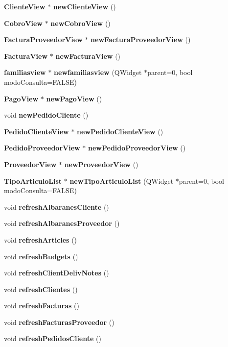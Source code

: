 \begin{CompactItemize}
\item 
{\bf Cliente\-View} $\ast$ {\bf new\-Cliente\-View} ()
\item 
{\bf Cobro\-View} $\ast$ {\bf new\-Cobro\-View} ()\label{classcompany_a17}

\item 
{\bf Factura\-Proveedor\-View} $\ast$ {\bf new\-Factura\-Proveedor\-View} ()
\item 
{\bf Factura\-View} $\ast$ {\bf new\-Factura\-View} ()
\item 
{\bf familiasview} $\ast$ {\bf newfamiliasview} (QWidget $\ast$parent=0, bool modo\-Consulta=FALSE)
\item 
{\bf Pago\-View} $\ast$ {\bf new\-Pago\-View} ()
\item 
void {\bf new\-Pedido\-Cliente} ()\label{classcompany_a22}

\item 
{\bf Pedido\-Cliente\-View} $\ast$ {\bf new\-Pedido\-Cliente\-View} ()
\item 
{\bf Pedido\-Proveedor\-View} $\ast$ {\bf new\-Pedido\-Proveedor\-View} ()
\item 
{\bf Proveedor\-View} $\ast$ {\bf new\-Proveedor\-View} ()
\item 
{\bf Tipo\-Articulo\-List} $\ast$ {\bf new\-Tipo\-Articulo\-List} (QWidget $\ast$parent=0, bool modo\-Consulta=FALSE)
\item 
void {\bf refresh\-Albaranes\-Cliente} ()\label{classcompany_a27}

\item 
void {\bf refresh\-Albaranes\-Proveedor} ()\label{classcompany_a28}

\item 
void {\bf refresh\-Articles} ()\label{classcompany_a29}

\item 
void {\bf refresh\-Budgets} ()\label{classcompany_a30}

\item 
void {\bf refresh\-Client\-Deliv\-Notes} ()\label{classcompany_a31}

\item 
void {\bf refresh\-Clientes} ()\label{classcompany_a32}

\item 
void {\bf refresh\-Facturas} ()\label{classcompany_a33}

\item 
void {\bf refresh\-Facturas\-Proveedor} ()\label{classcompany_a34}

\item 
void {\bf refresh\-Pedidos\-Cliente} ()\label{classcompany_a35}


\end{CompactItemize}
